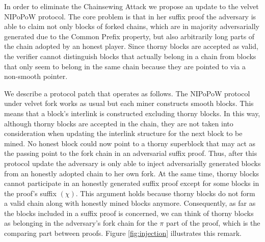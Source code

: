 In order to eliminate the Chainsewing Attack we propose an update to the velvet NIPoPoW protocol. The core problem is that in her suffix proof the adversary is able to claim not only blocks of forked chains,  which are in majority adversarially generated due to the Common Prefix property, but also arbitrarily long parts of the chain adopted by an honest player. Since thorny blocks are accepted as valid, the verifier cannot distinguish blocks that actually belong in a chain from blocks that only seem to belong in the same chain because they are pointed to via a non-smooth pointer.

We describe a protocol patch that operates as follows. The NIPoPoW protocol under velvet fork works as usual but each miner constructs smooth blocks. This means that  a block's interlink is constructed excluding thorny blocks. In this way, although thorny blocks are accepted in the chain, they are not taken into consideration when updating the interlink structure for the next block to be mined. No honest block could now point to a thorny superblock that may act as the passing point to the fork chain in an adversarial suffix proof. Thus, after this protocol update the adversary is only able to inject adversarially generated blocks from an honestly adopted chain to her own fork.
At the same time, thorny blocks cannot participate in an honestly
generated suffix proof except for some blocks in the proof's suffix $(\chi)$. This argument holds because thorny blocks do not form a valid chain along with honestly mined blocks anymore. Consequently, as far as the blocks included in a suffix proof is concerned, we can think of thorny blocks as belonging in the adversary's fork chain for the $\pi$ part of the proof,  which is the comparing part between proofs. Figure 
\ref{fig:injection} illustrates this remark.\\

